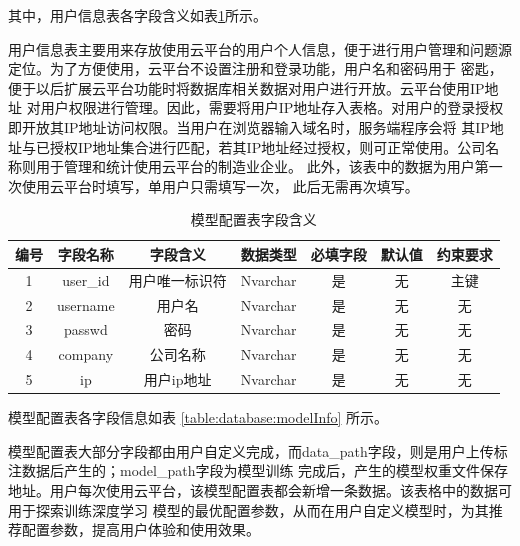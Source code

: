 其中，用户信息表各字段含义如表\ref{table:database:userInfo}所示。

用户信息表主要用来存放使用云平台的用户个人信息，便于进行用户管理和问题源定位。为了方便使用，云平台不设置注册和登录功能，用户名和密码用于
密匙，便于以后扩展云平台功能时将数据库相关数据对用户进行开放。云平台使用IP地址
对用户权限进行管理。因此，需要将用户IP地址存入表格。对用户的登录授权即开放其IP地址访问权限。当用户在浏览器输入域名时，服务端程序会将
其IP地址与已授权IP地址集合进行匹配，若其IP地址经过授权，则可正常使用。公司名称则用于管理和统计使用云平台的制造业企业。
此外，该表中的数据为用户第一次使用云平台时填写，单用户只需填写一次，
此后无需再次填写。

{
    \begin{table}[htb] 
        \caption{模型配置表字段含义}
        \label{table:database:userInfo}
        \centering
        \begin{tabular}[t]{c|c|c|c|c|c|c}
            \hline
            编号 & 字段名称 & 字段含义 & 数据类型 & 必填字段 & 默认值 & 约束要求  \\
            \hline
            1 & user\_id & 用户唯一标识符 & Nvarchar & 是 & 无 & 主键\\
            \hline
            2 & username & 用户名 & Nvarchar & 是 & 无 & 无 \\
            \hline
            3 & passwd & 密码 & Nvarchar & 是 & 无 & 无\\
            \hline
            4 & company & 公司名称 & Nvarchar & 是 & 无 & 无\\
            \hline
            5 & ip & 用户ip地址 & Nvarchar & 是 & 无 & 无\\
            \hline
        \end{tabular}
    \end{table}
}

模型配置表各字段信息如表 \ref{table:database:modelInfo} 所示。

模型配置表大部分字段都由用户自定义完成，而data\_path字段，则是用户上传标注数据后产生的；model\_path字段为模型训练
完成后，产生的模型权重文件保存地址。用户每次使用云平台，该模型配置表都会新增一条数据。该表格中的数据可用于探索训练深度学习
模型的最优配置参数，从而在用户自定义模型时，为其推荐配置参数，提高用户体验和使用效果。

